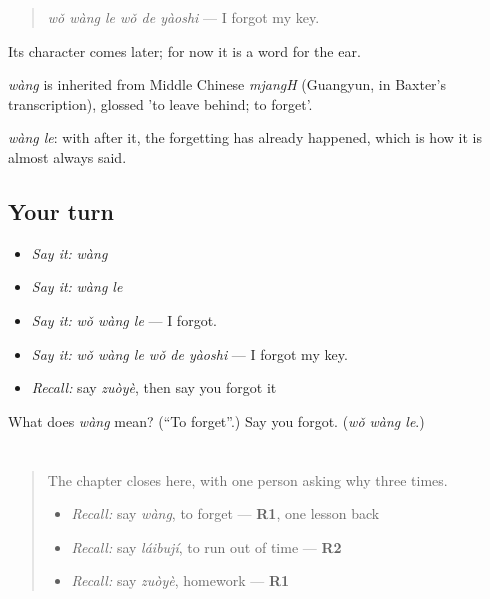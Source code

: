 \begin{quote}
\emph{wǒ wàng le wǒ de yàoshi} — I forgot my key.
\end{quote}

Its character comes later; for now it is a word for the ear.

\begin{cousinweb}
\emph{wàng} is inherited from Middle Chinese \emph{mjangH} (Guangyun, in Baxter's transcription), glossed 'to leave behind; to forget'.
\end{cousinweb}

\begin{grammarlens}[title={What you've built}]
\emph{wàng le}: with  after it, the forgetting has already happened, which is how it is almost always said.
\end{grammarlens}

\subsection*{Your turn}
\begin{itemize}
\raggedright
  \item \emph{Say it:} \emph{wàng}
  \item \emph{Say it:} \emph{wàng le}
  \item \emph{Say it:} \emph{wǒ wàng le} — I forgot.
  \item \emph{Say it:} \emph{wǒ wàng le wǒ de yàoshi} — I forgot my key.
  \item \emph{Recall:} say \emph{zuòyè}, then say you forgot it
\end{itemize}

\begin{tcolorbox}[breakable,colback=teal!4,colframe=teal!35!black,title={Before you move on}]
What does \emph{wàng} mean? (\textquotedblleft{}To forget\textquotedblright{}.) Say you forgot. (\emph{wǒ wàng le}.)
\end{tcolorbox}
\section[Practice]{}

\label{lesson:ZH-C95-practice}



\begin{quote}
The chapter closes here, with one person asking why three times.

\begin{itemize}
\raggedright
  \item \emph{Recall:} say \emph{wàng}, to forget — \textbf{R1}, one lesson back
  \item \emph{Recall:} say \emph{láibují}, to run out of time — \textbf{R2}
  \item \emph{Recall:} say \emph{zuòyè}, homework — \textbf{R1}
\end{itemize}
\end{quote}

